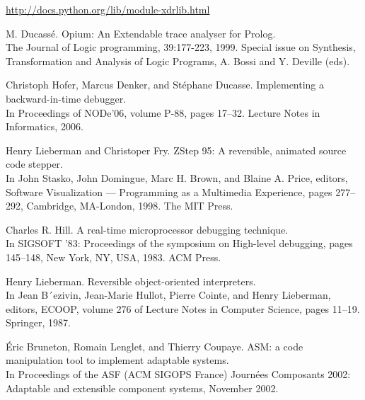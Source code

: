 \documentclass[12pt,legalpaper]{report}
\begin{document}
\begin{thebibliography}{30}

\href{http://docs.python.org/lib/module-xdrlib.html}{http://docs.python.org/lib/module-xdrlib.html}


 M. Ducassé. Opium: An Extendable trace analyser for Prolog.\\
The Journal of Logic programming, 39:177-223, 1999. Special issue on Synthesis, Transformation and Analysis of Logic Programs, A. Bossi and Y. Deville (eds).


Christoph Hofer, Marcus Denker, and Stéphane Ducasse. Implementing a backward-in-time debugger. \\
In Proceedings of NODe’06, volume P-88, pages 17–32. Lecture Notes in Informatics, 2006.

Henry Lieberman and Christoper Fry. ZStep 95: A reversible, animated source code stepper. \\
In John Stasko, John Domingue, Marc H. Brown, and Blaine A. Price, editors, Software Visualization — Programming as a Multimedia Experience, pages 277–292, Cambridge, MA-London, 1998. The MIT Press.

Charles R. Hill. A real-time microprocessor debugging technique. \\
In SIGSOFT ’83: Proceedings of the symposium on High-level debugging, pages 145–148, New York, NY, USA, 1983. ACM Press.

Henry Lieberman. Reversible object-oriented interpreters. \\
In Jean B´ezivin, Jean-Marie Hullot, Pierre Cointe, and Henry Lieberman, editors, ECOOP, volume 276 of Lecture Notes in Computer Science, pages 11–19. Springer, 1987.

 Éric Bruneton, Romain Lenglet, and Thierry Coupaye. ASM: a code manipulation tool to implement adaptable systems. \\
In Proceedings of the ASF (ACM SIGOPS France) Journées Composants 2002: Adaptable and extensible component systems, November 2002.


\end{thebibliography}
\end{document}

